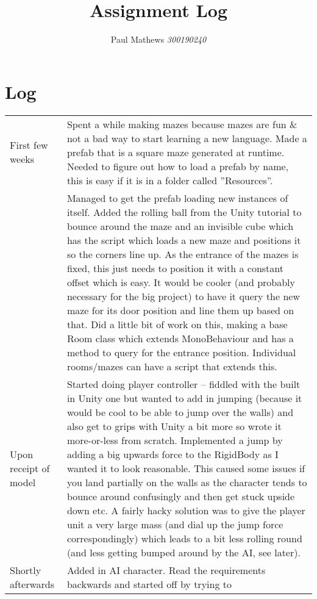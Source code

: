 \documentclass[11pt]{article}
\title{\sffamily{\Huge COMP313}\\ Assignment Log}
\author{\sffamily Paul Mathews \emph{300190240}}
\date{}
\begin{document}
\maketitle

\section{Log}

\begin{longtabu}{X[r] | X[3,l]}
\hline
First few weeks & Spent a while making mazes because mazes are fun \& not a bad way to 
				  start learning a new language. Made a prefab that is a square maze 
				  generated at runtime. Needed to figure out how to load a prefab by name,
				  this is easy if it is in a folder called ''Resources''. \\
				& Managed to get the prefab loading new instances of itself. Added the rolling ball from
				  the Unity tutorial to bounce around the maze and an invisible cube which has the script
				  which loads a new maze and positions it so the corners line up. As the entrance of the 
				  mazes is fixed, this just needs to position it with a constant offset which is easy. It
				  would be cooler (and probably necessary for the big project) to have it query the new 
				  maze for its door position and line them up based on that. Did a little bit of work on
				  this, making a base Room class which extends MonoBehaviour and has a method to query for
				  the entrance position. Individual rooms/mazes can have a script that extends this.\\
	\hline
Upon receipt of model & Started doing player controller -- fiddled with the built in Unity
					    one but wanted to add in jumping (because it would be cool to be able to 
					    jump over the walls) and also get to grips with Unity a bit more so wrote it
					    more-or-less from scratch. Implemented a jump by adding a big upwards force
					    to the RigidBody as I wanted it to look reasonable. This caused some issues if 
					    you land partially on the walls as the character tends to bounce around confusingly
					    and then get stuck upside down etc. A fairly hacky solution was to give the player
					    unit a very large mass (and dial up the jump force correspondingly) which leads to 
					    a bit less rolling round (and less getting bumped around by the AI, see later).\\
	\hline
Shortly afterwards    & Added in AI character. Read the requirements backwards and started off by trying to

\end{longtabu}
\end{document}
